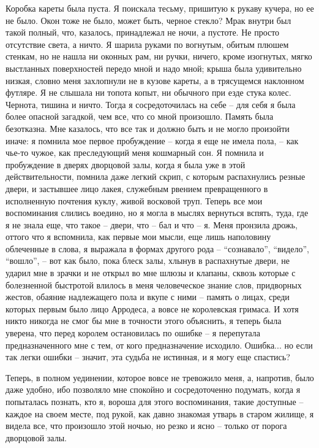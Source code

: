 Коробка кареты была  пуста. Я поискала тесьму, пришитую к  рукаву кучера, но
ее  не было.  Окон тоже  не  было, может  быть, черное  стекло? Мрак  внутри
был  такой  полный,  что,  казалось,  принадлежал не  ночи,  а  пустоте.  Не
просто  отсутствие света,  а  ничто.  Я шарила  руками  по вогнутым,  обитым
плюшем  стенкам,  но не  нашла  ни  оконных  рам,  ни ручки,  ничего,  кроме
изогнутых, мягко выстланных поверхностей передо мной и надо мной; крыша была
удивительно  низкая,  словно  меня  захлопнули  не  в  кузове  кареты,  а  в
трясущемся наклонном футляре. Я не слышала  ни топота копыт, ни обычного при
езде стука колес.  Чернота, тишина и ничто. Тогда я  сосредоточилась на себе
-- для себя я  была более опасной загадкой, чем все,  что со мной произошло.
Память была безотказна. Мне  казалось, что все так и должно  быть и не могло
произойти  иначе:  я помнила  мое  первое  пробуждение  --  когда я  еще  не
имела пола,  -- как  чье-то чужое,  как преследующий  меня кошмарный  сон. Я
помнила  и пробуждение  в дверях  дворцовой залы,  когда я  была уже  в этой
действительности, помнила  даже легкий скрип, с  которым распахнулись резные
двери, и застывшее лицо лакея, служебным рвением превращенного в исполненную
почтения куклу,  живой восковой  труп. Теперь  все мои  воспоминания слились
воедино, но я могла в мыслях вернуться вспять, туда, где я не знала еще, что
такое --  двери, что -- бал  и что -- я.  Меня пронзила дрожь, оттого  что я
вспомнила, как первые  мои мысли, еще лишь наполовину облеченные  в слова, я
выражала в формах  другого рода -- ``сознавало'',  ``видело'', ``вошло'', --
вот как было, пока  блеск залы, хлынув в распахнутые двери,  не ударил мне в
зрачки и  не открыл  во мне  шлюзы и клапаны,  сквозь которые  с болезненной
быстротой  влилось  в  меня  человеческое знание  слов,  придворных  жестов,
обаяние надлежащего  пола и вкупе  с ними --  память о лицах,  среди которых
первым было  лицо Арродеса,  а вовсе  не королевская  гримаса. И  хотя никто
никогда не  смог бы мне в  точности этого объяснить, я  теперь была уверена,
что перед  королем остановилась по  ошибке -- я  перепутала предназначенного
мне с  тем, от  кого предназначение  исходило. Ошибка...  но если  так легки
ошибки -- значит, эта судьба не истинная, и я могу еще спастись?

Теперь,  в  полном  уединении,  которое  вовсе  не  тревожило  меня, а,
напротив, было даже удобно, ибо  позволяло  мне  спокойно  и  сосредоточенно
подумать,  когда я попыталась познать, кто я, вороша для этого воспоминания,
такие доступные -- каждое на своем месте,  под  рукой,  как  давно  знакомая
утварь  в  старом жилище, я видела все, что произошло этой ночью, но резко и
ясно -- только от порога дворцовой залы.

